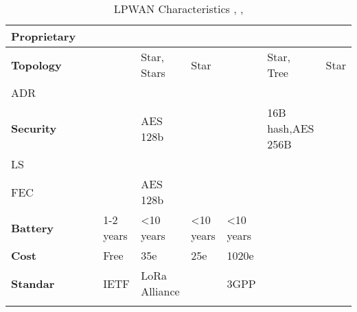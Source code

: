 \begin{longtable}{l|l|l|l|l|l|l|l}
	\bf{Proprietary}                   &                  & \ko          & \ko              & \ok           & \ko         & \ko                & \ko             \\\hline
	\bf{Topology}                      & \                & \ko          & Star, Stars      & Star          & \ko         & Star, Tree         & Star            \\\hline
	\ac{ADR}                           & \                & \ko          & \ok              & \ko           & \ko         & \ok                & \ko             \\\hline
	\bf{Security}                      & \                & \ko          & AES 128b         & \ko           & \ko         & 16B hash,AES 256B  & \ko             \\\hline
	\ac{LS}                            & \                & \ko          & \ok              & \ko           & \ko         & \ko                & \ko             \\\hline
	\ac{FEC}                           & \                & \ko          & AES 128b         & \ko           & \ko         & \ok                & \ko             \\\hline
	\bf{Battery}                       & \                & 1-2	years    & <10 years        & <10 years     & <10 years   &                    &                 \\\hline
	\bf{Cost}                          & \                & Free         & 35e              & 25e           & 1020e       &                    &                 \\\hline
	\bf{Standar}                       &                  & IETF         & LoRa	Alliance    &               & 3GPP        &                    &                 \\\hline

\caption{\label{tab:LPWan_characteristics} LPWAN Characteristics \cite{al-kashoash_comparison_2016}, \cite{lopes_design_2019}, \cite{raza_low_22}}
\end{longtable}

\clearpage
\newpage

